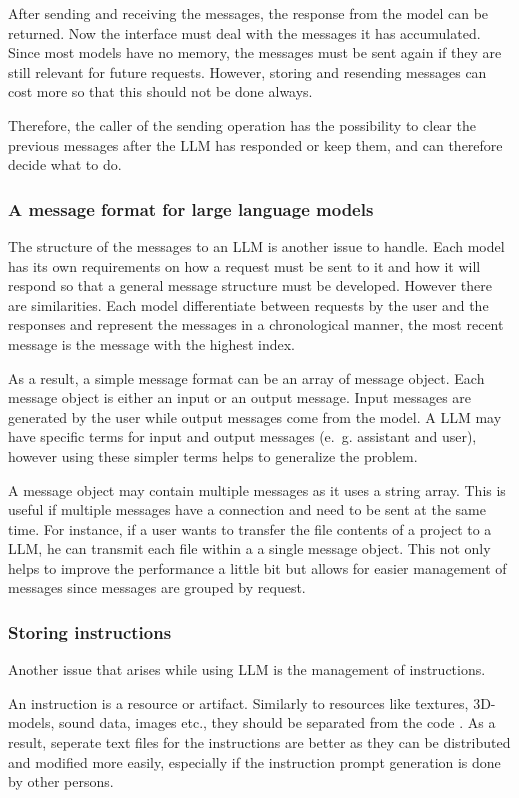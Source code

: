 After sending and receiving the messages, the response from the model can be returned. Now the interface must deal with the messages it has accumulated. Since most models have no memory, the messages must be sent again if they are still relevant for future requests. However, storing and resending messages can cost more so that this should not be done always.

Therefore, the caller of the sending operation has the possibility to clear the previous messages after the \ac{LLM} has responded or keep them, and can therefore decide what to do.

\subsubsection{A message format for large language models} \label{sec:llm_msg_structure}
The structure of the messages to an \ac{LLM} is another issue to handle. Each model has its own requirements on how a request must be sent to it and how it will respond so that a general message structure must be developed. However there are similarities. Each model differentiate between requests by the user and the responses and represent the messages in a chronological manner, the most recent message is the message with the highest index. 

As a result, a simple message format can be an array of message object. Each message object is either an input or an output message. Input messages are generated by the user while output messages come from the model. A \ac{LLM} may have specific terms for input and output messages (e.~g. assistant and user), however using these simpler terms helps to generalize the problem.

A message object may contain multiple messages as it uses a string array. This is useful if multiple messages have a connection and need to be sent at the same time. For instance, if a user wants to transfer the file contents of a project to a \ac{LLM}, he can transmit each file within a a single message object. This not only helps to improve the performance a little bit but allows for easier management of messages since messages are grouped by request. 

\subsubsection{Storing instructions}\label{llm_msg_storage}

Another issue that arises while using \ac{LLM} is the management of instructions.

An instruction is a resource or artifact. Similarly to resources like textures, 3D-models, sound data, images etc., they should be separated from the code \cite{separate_code_data}. As a result, seperate text files for the instructions are better as they can be distributed and modified more easily, especially if the instruction prompt generation is done by other persons. 

\hfill
